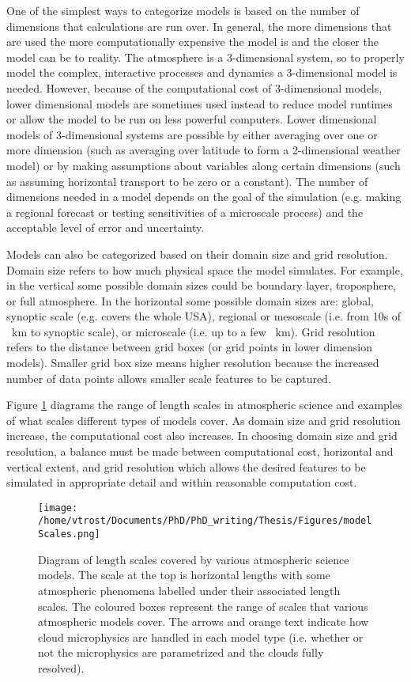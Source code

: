One of the simplest ways to categorize models is based on the number of dimensions that calculations are run over. In general, the more dimensions that are used the more computationally expensive the model is and the closer the model can be to reality. The atmosphere is a 3-dimensional system, so to properly model the complex, interactive processes and dynamics a 3-dimensional model is needed. However, because of the computational cost of 3-dimensional models, lower dimensional models are sometimes used instead to reduce model runtimes or allow the model to be run on less powerful computers. Lower dimensional models of 3-dimensional systems are possible by either averaging over one or more dimension (such as averaging over latitude to form a 2-dimensional weather model) or by making assumptions about variables along certain dimensions (such as assuming horizontal transport to be zero or a constant). The number of dimensions needed in a model depends on the goal of the simulation (e.g. making a regional forecast or testing sensitivities of a microscale process) and the acceptable level of error and uncertainty. \citep{rog1989,zhan2015}

Models can also be categorized based on their domain size and grid resolution. Domain size refers to how much physical space the model simulates. For example, in the vertical some possible domain sizes could be boundary layer, troposphere, or full atmosphere. In the horizontal some possible domain sizes are: global, synoptic scale (e.g. covers the whole USA), regional or mesoscale (i.e. from 10s of \SI{}{km} to synoptic scale), or microscale (i.e. up to a few \SI{}{km}). Grid resolution refers to the distance between grid boxes (or grid points in lower dimension models). Smaller grid box size means higher resolution because the increased number of data points allows smaller scale features to be captured. 

Figure \ref{fig:modelScales} diagrams the range of length scales in atmospheric science and examples of what scales different types of models cover. As domain size and grid resolution increase, the computational cost also increases. In choosing domain size and grid resolution, a balance must be made between computational cost, horizontal and vertical extent, and grid resolution which allows the desired features to be simulated in appropriate detail and within reasonable computation cost.

\begin{figure}[H]
	\centering
	\texttt{[image: /home/vtrost/Documents/PhD/PhD\_writing/Thesis/Figures/modelScales.png]}
	\caption{Diagram of length scales covered by various atmospheric science models. The scale at the top is horizontal lengths with some atmospheric phenomena labelled under their associated length scales. The coloured boxes represent the range of scales that various atmospheric models cover. The arrows and orange text indicate how cloud microphysics are handled in each model type (i.e. whether or not  the microphysics are parametrized and the clouds fully resolved). \citep[][Figure 2]{morr2020}}
	\label{fig:modelScales}
\end{figure}


